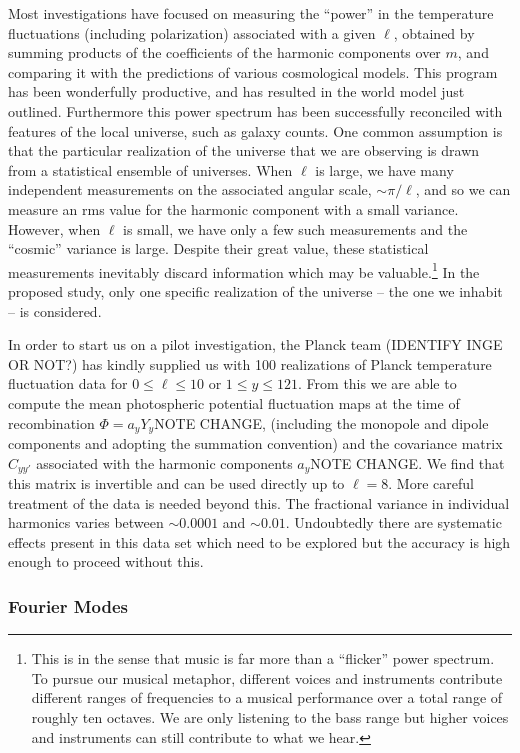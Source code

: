 \documentclass[psfig,11pt]{article}
\begin{document}
Most investigations have focused on measuring the ``power'' in the temperature fluctuations (including polarization) associated with a given $\ell$, obtained by summing products of the coefficients of the harmonic components over $m$, and comparing it with the predictions of various cosmological models. This program has been wonderfully productive, and has resulted in the world model just outlined. Furthermore this power spectrum has been successfully reconciled with features of the local universe, such as galaxy counts. One common assumption is that the particular realization of the universe that we are observing is drawn from a statistical ensemble of universes. When $\ell$ is large, we have many independent measurements on the associated angular scale, $\sim\pi/\ell$, and so we can measure an rms value for the harmonic component with a small variance. However, when $\ell$ is small, we have only a few such measurements and the ``cosmic'' variance is large. Despite their great value, these statistical measurements inevitably discard information which may be valuable.\footnote{This is in the sense that music is far more than a ``flicker'' power spectrum. To pursue our musical metaphor, different voices and instruments contribute different ranges of frequencies to a musical performance over a total range of roughly ten octaves. We are only listening to the bass range but higher voices and instruments can still contribute to what we hear.}  In the proposed study, only one specific realization of the universe -- the one we inhabit --  is considered.

In order to start us on a pilot investigation, the Planck team (IDENTIFY INGE OR NOT?) has kindly supplied us with 100 realizations of Planck temperature fluctuation data for $0\le\ell\le10$ or $1\le y\le121$. From this we are able to compute the mean photospheric potential fluctuation maps at the time of recombination $\Phi=a_yY_y$NOTE CHANGE, (including the monopole and dipole components and adopting the summation convention) and the covariance matrix $C_{yy'}$ associated with the harmonic components $a_y$NOTE CHANGE. We find that this matrix is invertible and can be used directly up to $\ell=8$. More careful treatment of the data is needed beyond this. The fractional variance in individual harmonics varies between $\sim0.0001$ and $\sim0.01$. Undoubtedly there are systematic effects present in this data set which need to be explored but the accuracy is high enough to proceed without this.

\subsubsection{Fourier Modes}
\end{document}
